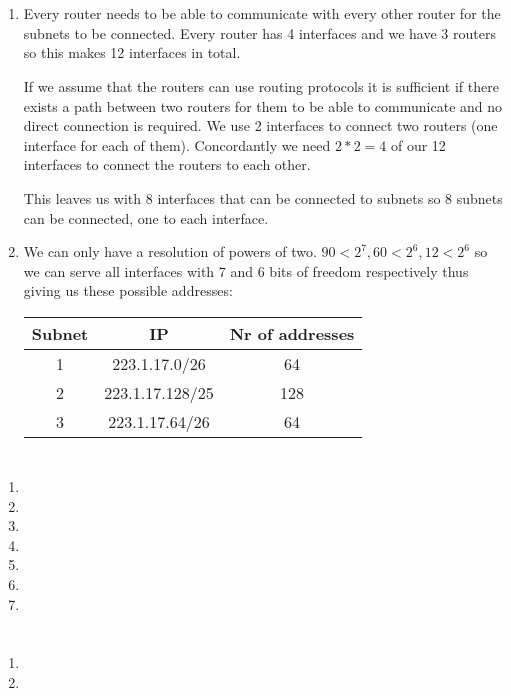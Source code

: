 \documentclass[12pt, a4paper]{article}
\begin{document}
\section{} %
\begin{enumerate}[a]
	\item %
	Every router needs to be able to communicate with every other router for the subnets to be connected. Every router has 4 interfaces and we have 3 routers so this makes 12 interfaces in total.

	If we assume that the routers can use routing protocols it is sufficient if there exists a path between two routers for them to be able to communicate and no direct connection is required. We use 2 interfaces to connect two routers (one interface for each of them). Concordantly we need $2 * 2 = 4$ of our 12 interfaces to connect the routers to each other.

	This leaves us with 8 interfaces that can be connected to subnets so 8 subnets can be connected, one to each interface.

	\item %
	We can only have a resolution of powers of two. $90 < 2^7, 60 < 2^6, 12 < 2^6$ so we can serve all interfaces with 7 and 6 bits of freedom respectively thus giving us these possible addresses:

	\begin{tabular}{|c|c|c|}
		\hline
		Subnet & IP & Nr of addresses\\\hline
		1 & 223.1.17.0/26 & 64\\
		2 & 223.1.17.128/25 & 128\\
		3 & 223.1.17.64/26 & 64\\
		\hline
	\end{tabular}

\end{enumerate}

\section{} %
\begin{enumerate}[1]
	\item %
	\item %
	\item %
	\item %
	\item %
	\item %
	\item %
\end{enumerate}

\section{} %

\section{} %
\begin{enumerate}[1]
	\item %
	\item %
\end{enumerate}
\end{document}
